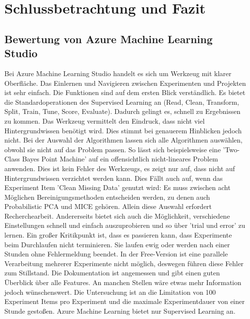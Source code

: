 \chapter{Schlussbetrachtung und Fazit}\label{chap:Bewertung}


\section{Bewertung von Azure Machine Learning Studio}\label{sec:BeswertungAzure}
Bei Azure Machine Learning Studio handelt es sich um Werkzeug mit klarer Oberfläche. Das Einlernen und Navigieren zwischen Experimenten und Projekten ist sehr einfach. Die Funktionen sind auf dem ersten Blick verständlich. Es bietet die Standardoperationen des Supervised Learning an (Read, Clean, Transform, Split, Train, Tune, Score, Evaluate). Dadurch gelingt es, schnell zu Ergebnissen zu kommen.\newline
Das Werkzeug vermittelt den Eindruck, dass nicht viel Hintergrundwissen benötigt wird. Dies stimmt bei genauerem Hinblicken jedoch nicht. Bei der Auswahl der Algorithmen lassen sich alle Algorithmen auswählen, obwohl sie nicht auf das Problem passen. So lässt sich beispielsweise eine 'Two-Class Bayes Point Machine' auf ein offensichtlich nicht-lineares Problem anwenden. Dies ist kein Fehler des Werkzeugs, es zeigt nur auf, dass nicht auf Hintergrundwissen verzichtet werden kann. Dies Fällt auch auf, wenn  das Experiment Item 'Clean Missing Data' genutzt wird: Es muss zwischen acht Möglichen Bereinigungsmethoden entscheiden werden, zu denen auch Probabilistic PCA und MICE gehören. Allein diese Auswahl erfordert Recherchearbeit.
Andererseits bietet sich auch die Möglichkeit, verschiedene Einstellungen schnell und einfach auszuprobieren und so über 'trial und error' zu lernen.\newline
Ein großer Kritikpunkt ist, dass es passieren kann, dass Experimente beim Durchlaufen nicht terminieren. Sie laufen ewig oder werden nach einer Stunden ohne Fehlermeldung beendet. In der Free-Version ist eine parallele Verarbeitung mehrerer Experimente nicht möglich, deswegen führen diese Fehler zum Stillstand.\newline
Die Dokumentation ist angemessen und gibt einen guten Überblick über alle Features. An manchen Stellen wäre etwas mehr Information jedoch wünschenswert. Die Untersuchung ist an die Limitation von 100 Experiment Items pro Experiment und die maximale Experimentdauer von einer Stunde gestoßen.\newline
Azure Machine Learning bietet nur Supervised Learning an.\newline
